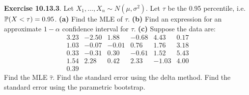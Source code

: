 \textbf{Exercise 10.13.3}. Let
\(X_{1}, \dots, X_{n} \sim N(\mu, \sigma^{2})\). Let \(\tau\) be the 0.95
percentile, i.e.~\(\operatorname{\mathbb{P}}(X < \tau) = 0.95\).
\textbf{(a)} Find the MLE of \(\tau\).
\textbf{(b)} Find an expression for an approximate \(1 - \alpha\)
confidence interval for \(\tau\).
\textbf{(c)} Suppose the data are:
\[
\begin{matrix}
3.23 & -2.50 &  1.88 & -0.68 &  4.43 & 0.17 \\ 
1.03 & -0.07 & -0.01 &  0.76 &  1.76 & 3.18 \\
0.33 & -0.31 &  0.30 & -0.61 &  1.52 & 5.43 \\
1.54 &  2.28 &  0.42 &  2.33 & -1.03 & 4.00 \\
0.39 
\end{matrix}
\]
Find the MLE \(\hat{\tau}\). Find the standard error using the delta method. Find the standard error using the parametric bootstrap.

